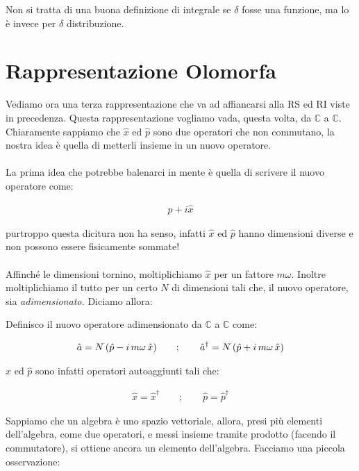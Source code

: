 	Non si tratta di una buona definizione di integrale se $\delta$ fosse una funzione, ma lo è invece per $\delta$ distribuzione.
	
\section{Rappresentazione  Olomorfa}
	
	Vediamo ora una terza rappresentazione che va ad affiancarsi alla RS ed RI viste in precedenza. Questa rappresentazione vogliamo vada, questa volta, da $\mathbb{C}$ a $\mathbb{C}$. Chiaramente sappiamo che $\hat{x}$ ed $\hat{p}$ sono due operatori che non commutano, la nostra idea è quella di metterli insieme in un nuovo operatore.
	\\
	\\
	La prima idea che potrebbe balenarci in mente è quella di scrivere il nuovo operatore come:

\begin{align*}
	\hat{p} + i \hat{x}
\end{align*}
	
	purtroppo questa dicitura non ha senso, infatti $\hat{x}$ ed $\hat{p}$ hanno dimensioni diverse e non possono essere fisicamente sommate!
	\\
	\\
	Affinché le dimensioni tornino, moltiplichiamo $\hat{x}$ per un fattore $m\omega$. Inoltre moltiplichiamo il tutto per un certo $N$ di dimensioni tali che, il nuovo operatore, sia \textit{adimensionato.} Diciamo allora:
	
\begin{mydef}
	Definisco il nuovo operatore adimensionato da $\mathbb{C}$ a $\mathbb{C}$ come:
	
\begin{align*}
	\hat{a} = N \, \qty(\hat{p} - i\, m\omega \, \hat{x}) \qquad ; \qquad \hat{a}^{\dagger} = N \, \qty(\hat{p} + i\, m\omega \, \hat{x})
\end{align*}

	$\hat{x}$ ed $\hat{p}$ sono infatti operatori autoaggiunti tali che:

\begin{align*}
	\hat{x} = \hat{x}^{\dagger} \qquad ; \qquad \hat{p} = \hat{p}^{\dagger} 
\end{align*}
\end{mydef}

	Sappiamo che un algebra è uno spazio vettoriale, allora, presi più elementi dell'algebra, come due operatori, e messi insieme tramite prodotto (facendo il commutatore), si ottiene ancora un elemento dell'algebra. Facciamo una piccola osservazione: 
	
